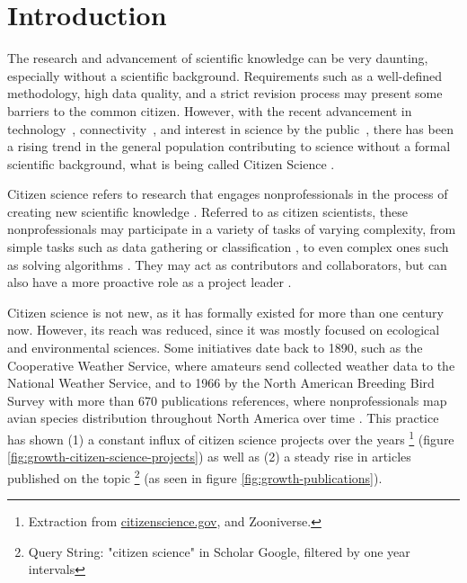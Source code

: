 \chapter*[Introduction]{Introduction}
\label{chap:introduction}

The research and advancement of scientific knowledge can be very daunting, especially without a scientific background. Requirements such as a well-defined methodology, high data quality, and a strict revision process may present some barriers to the common citizen. However, with the recent advancement in technology~\cite{newman2012future}, connectivity~\cite{newman2012future}, and interest in science by the public~\cite{silvertown2009new}, there has been a rising trend in the general population contributing to science without a formal scientific background, what is being called Citizen Science \cite{mckinley2017citizen}.

Citizen science refers to research that engages nonprofessionals in the process of creating new scientific knowledge \cite{bonney2014next}. Referred to as citizen scientists, these nonprofessionals may participate in a variety of tasks of varying complexity, from simple tasks such as data gathering or classification \cite{barker2013pascal}, to even complex ones such as solving algorithms \cite{cooper2010predicting}. They may act as contributors and collaborators, but can also have a more proactive role as a project leader \cite{robinson2018ten}.

Citizen science is not new, as it has formally existed for more than one century now. However, its reach was reduced, since it was mostly focused on ecological and environmental sciences. Some initiatives date back to 1890, such as the Cooperative Weather Service, where amateurs send collected weather data to the National Weather Service, and to 1966 by the North American Breeding Bird Survey with more than 670 publications references, where nonprofessionals map avian species distribution throughout North America over time \cite{kosmala2016assessing}. This practice has shown (1) a constant influx of citizen science projects over the years \footnote{Extraction from \url{citizenscience.gov}, and Zooniverse.} (figure \ref{fig:growth-citizen-science-projects}) as well as (2) a steady rise in articles published on the topic \footnote{Query String: "citizen science" in Scholar Google, filtered by one year intervals} (as seen in figure \ref{fig:growth-publications}).

